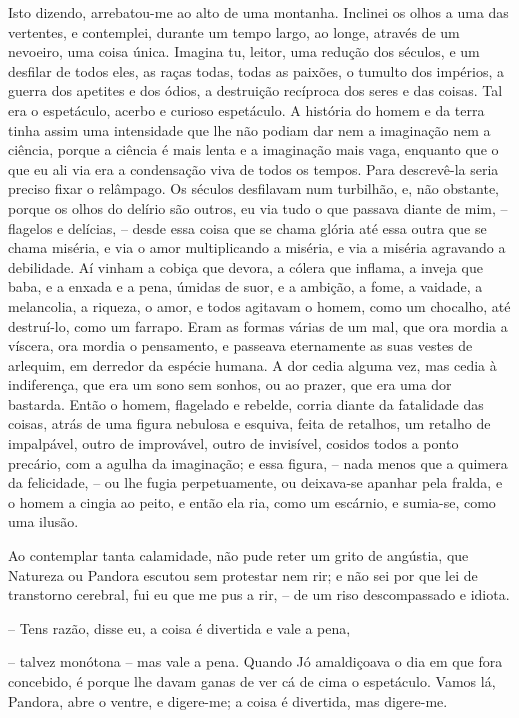 \begin{corollary}
Isto dizendo, arrebatou-me ao alto de uma montanha. Inclinei os olhos a uma das vertentes, e contemplei, durante um tempo largo, ao longe, através de um nevoeiro, uma coisa única. Imagina tu, leitor, uma redução dos séculos, e um desfilar de todos eles, as raças todas, todas as paixões, o tumulto dos impérios, a guerra dos apetites e dos ódios, a destruição recíproca dos seres e das coisas. Tal era o espetáculo, acerbo e curioso espetáculo. A história do homem e da terra tinha assim uma intensidade que lhe não podiam dar nem a imaginação nem a ciência, porque a ciência é mais lenta e a imaginação mais vaga, enquanto que o que eu ali via era a condensação viva de todos os tempos. Para descrevê-la seria preciso fixar o relâmpago. Os séculos desfilavam num turbilhão, e, não obstante, porque os olhos do delírio são outros, eu via tudo o que passava diante de mim, -- flagelos e delícias, -- desde essa coisa que se chama glória até essa outra que se chama miséria, e via o amor multiplicando a miséria, e via a miséria agravando a debilidade. Aí vinham a cobiça que devora, a cólera que inflama, a inveja que baba, e a enxada e a pena, úmidas de suor, e a ambição, a fome, a vaidade, a melancolia, a riqueza, o amor, e todos agitavam o homem, como um chocalho, até destruí-lo, como um farrapo. Eram as formas várias de um mal, que ora mordia a víscera, ora mordia o pensamento, e passeava eternamente as suas vestes de arlequim, em derredor da espécie humana. A dor cedia alguma vez, mas cedia à indiferença, que era um sono sem sonhos, ou ao prazer, que era uma dor bastarda. Então o homem, flagelado e rebelde, corria diante da fatalidade das coisas, atrás de uma figura nebulosa e esquiva, feita de retalhos, um retalho de impalpável, outro de improvável, outro de invisível, cosidos todos a ponto precário, com a agulha da imaginação; e essa figura, -- nada menos que a quimera da felicidade, -- ou lhe fugia perpetuamente, ou deixava-se apanhar pela fralda, e o homem a cingia ao peito, e então ela ria, como um escárnio, e sumia-se, como uma ilusão.

Ao contemplar tanta calamidade, não pude reter um grito de angústia, que Natureza ou Pandora escutou sem protestar nem rir; e não sei por que lei de transtorno cerebral, fui eu que me pus a rir, -- de um riso descompassado e idiota.

-- Tens razão, disse eu, a coisa é divertida e vale a pena,

-- talvez monótona -- mas vale a pena. Quando Jó amaldiçoava o dia em que fora concebido, é porque lhe davam ganas de ver cá de cima o espetáculo. Vamos lá, Pandora, abre o ventre, e digere-me; a coisa é divertida, mas digere-me.


\end{corollary}
